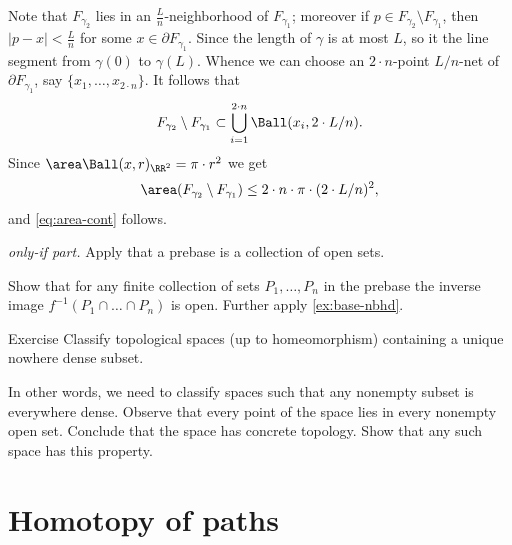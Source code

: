 Note that $F_{\gamma_2}$ lies in an $\tfrac Ln$-neighborhood of $F_{\gamma_1}$;
moreover if $p\in F_{\gamma_2}\setminus F_{\gamma_1}$, then $|p-x|<\tfrac Ln$ for some $x\in\partial F_{\gamma_1}$.
Since the length of $\gamma$ is at most $L$, so it the line segment from $\gamma(0)$ to $\gamma(L)$.
Whence we can choose an $2\cdot n$-point $L/n$-net of $\partial F_{\gamma_1}$, say $\{x_1,\dots,x_{2\cdot n}\}$.
It follows that
\[F_{\gamma_2}\setminus F_{\gamma_1}\subset \bigcup_{i=1}^{2\cdot n}\Ball(x_i,2\cdot L/n).\]
Since $\area\Ball(x,r)_{\RR^2}=\pi\cdot r^2$ we get
\[\area (F_{\gamma_2}\setminus F_{\gamma_1})\le 2\cdot n\cdot\pi \cdot (2\cdot L/n)^2,\]
and \ref{eq:area-cont} follows.
\qeds
















\parbf{\ref{ex:prebase};} \textit{only-if part.}
Apply that a prebase is a collection of open sets.

 Show that for any finite collection of sets $P_1,\dots,P_n$ in the prebase the inverse image
$f^{-1}(P_1\cap\dots\cap P_n)$
is open.
Further apply \ref{ex:base-nbhd}.















\begin{thm}{Exercise}\label{ex:nowhere-dense}
Classify topological spaces (up to homeomorphism) containing a unique nowhere
dense subset.
\end{thm}

In other words, we need to classify spaces such that any nonempty subset is everywhere dense.
Observe that every point of the space lies in every nonempty open set.
Conclude that the space has concrete topology.
Show that any such space has this property.







\section{Homotopy of paths}




